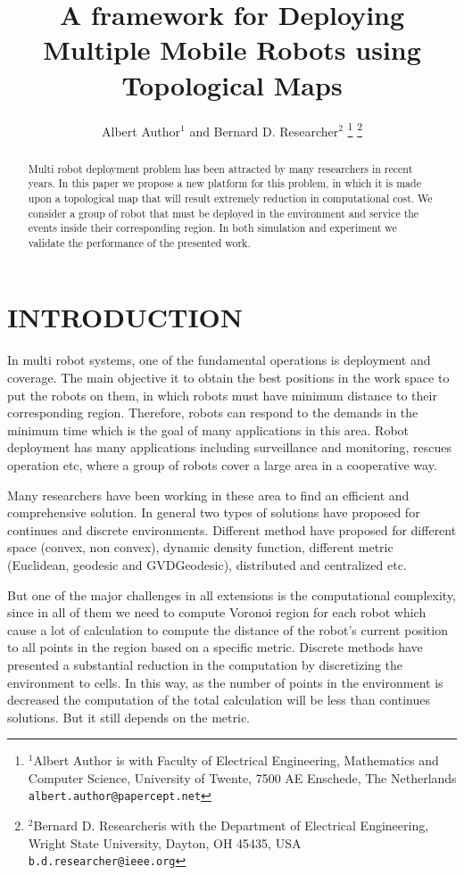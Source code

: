 \documentclass[letterpaper, 10 pt, conference]{ieeeconf}  %
\title{\LARGE \bf
A framework for Deploying Multiple Mobile Robots using Topological Maps
}
\author{Albert Author$^{1}$ and Bernard D. Researcher$^{2}$%
\thanks{$^{1}$Albert Author is with Faculty of Electrical Engineering, Mathematics and Computer Science,
        University of Twente, 7500 AE Enschede, The Netherlands
        {\tt\small albert.author@papercept.net}}%
\thanks{$^{2}$Bernard D. Researcheris with the Department of Electrical Engineering, Wright State University,
        Dayton, OH 45435, USA
        {\tt\small b.d.researcher@ieee.org}}%
}
\begin{document}
\maketitle
\thispagestyle{empty}
\pagestyle{empty}


\begin{abstract}

Multi robot deployment problem has been attracted by many researchers in recent years. In this paper we propose a new platform for this problem, in which it is made upon a topological map that will result extremely reduction in computational cost. We consider a group of robot that must be deployed in the environment and service the events inside their corresponding region. In both simulation and experiment we validate the performance of the presented work.
\end{abstract}

\section{INTRODUCTION}

In multi robot systems, one of the fundamental operations is deployment and coverage. The main objective it to obtain the best positions in the work space to put the robots on them, in which robots must have minimum distance to their corresponding region. Therefore, robots can respond to the demands in the minimum time which is the goal of many applications in this area.
Robot deployment has many applications including surveillance and monitoring, rescues operation etc, where a group of robots cover a large area in a cooperative way. 
%

Many researchers have been working in these area to find an efficient and comprehensive solution. In general two types of solutions have proposed for continues and discrete environments. Different method have proposed for different space (convex, non convex), dynamic density function, different metric (Euclidean, geodesic and GVDGeodesic), distributed and centralized etc.
%

But one of the major challenges in all extensions is the computational complexity, since in all of them we need to compute Voronoi region for each robot which cause a lot of calculation to compute the distance of the robot's current position to all points in the region based on a specific metric. Discrete methods have presented a substantial reduction in the computation by discretizing the environment to cells. In this way, as the number of points in the environment is decreased the computation of the total calculation will be less than continues solutions. But it still depends on the metric.
%
\end{document}
